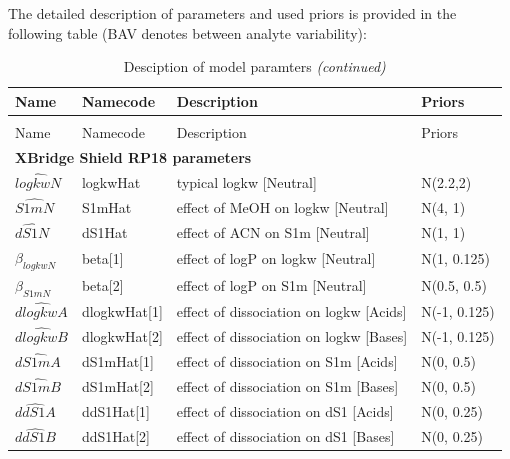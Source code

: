 \documentclass[
]{article}
\begin{document}
The detailed description of parameters and used priors is provided in
the following table (BAV denotes between analyte variability):

\begin{longtable}[t]{l|l|l|l}
\caption{Desciption of model paramters}\\
\hline
Name & Namecode & Description & Priors\\
\hline
\endfirsthead
\caption[]{Desciption of model paramters \textit{(continued)}}\\
\hline
Name & Namecode & Description & Priors\\
\hline
\endhead
\multicolumn{4}{l}{\textbf{XBridge Shield RP18 parameters}}\\
\hline
\hspace{1em}$\hat{logkwN}$ & logkwHat & typical logkw [Neutral] & N(2.2,2)\\
\hline
\hspace{1em}$\hat{S1mN}$ & S1mHat & effect of MeOH on logkw [Neutral] & N(4, 1)\\
\hline
\hspace{1em}$\hat{dS1N}$ & dS1Hat & effect of ACN on S1m [Neutral] & N(1, 1)\\
\hline
\hspace{1em}$\beta_{logkwN}$ & beta[1] & effect of logP on logkw [Neutral] & N(1, 0.125)\\
\hline
\hspace{1em}$\beta_{S1mN}$ & beta[2] & effect of logP on S1m [Neutral] & N(0.5, 0.5)\\
\hline
\hspace{1em}$\hat{dlogkwA}$ & dlogkwHat[1] & effect of dissociation on logkw [Acids] & N(-1, 0.125)\\
\hline
\hspace{1em}$\hat{dlogkwB}$ & dlogkwHat[2] & effect of dissociation on logkw [Bases] & N(-1, 0.125)\\
\hline
\hspace{1em}$\hat{dS1mA}$ & dS1mHat[1] & effect of dissociation on S1m [Acids] & N(0, 0.5)\\
\hline
\hspace{1em}$\hat{dS1mB}$ & dS1mHat[2] & effect of dissociation on S1m [Bases] & N(0, 0.5)\\
\hline
\hspace{1em}$\hat{ddS1A}$ & ddS1Hat[1] & effect of dissociation on dS1 [Acids] & N(0, 0.25)\\
\hline
\hspace{1em}$\hat{ddS1B}$ & ddS1Hat[2] & effect of dissociation on dS1 [Bases] & N(0, 0.25)\\

\end{longtable}
\end{document}
